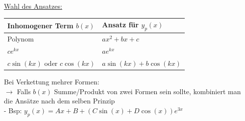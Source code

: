 \documentclass[6pt]{article}
\begin{document}
\begin{multicols*}{3}
			
			\vspace{4mm}
			\underline{Wahl des Ansatzes:}
			\vspace{0mm}
			\begin{table}[H]
					\begin{tabular}{|l|l|}
							\hline
							\textbf{Inhomogener Term $b(x)$} & \textbf{Ansatz f{\"u}r $y_p(x)$}		\\ \hline
								Polynom				& $ax^2 + bx + c$								\\ \hline
								$c e^{k x}$ & $ae^{kx}$													\\ \hline
								$c\sin(kx)$ oder $c\cos(kx)$ & $a\sin(kx) + b\cos(kx)$  \\ \hline
					\end{tabular}
				\end{table}


		Bei Verkettung mehrer Formen: \\
		$\rightarrow$ Falls $b(x)$ Summe/Produkt von zwei Formen sein sollte, kombiniert man die Ans{\"a}tze nach dem selben Prinzip \vspace{1mm}\\
		- Bsp: $y_p(x) = Ax + B + (C\sin(x) + D\cos(x))e^{3x}$
		
		\vspace{10mm}


\end{multicols*}
\end{document}
